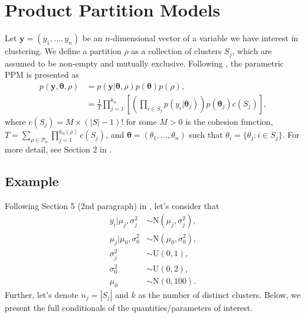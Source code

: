 \documentclass{article}
\begin{document}
\section{Product Partition Models}
Let $\textbf{y} = (y_{1}, ..., y_{n})$ be an $n$-dimensional vector of a variable we have interest in clustering. We define a partition $\rho$ as a collection of clusters $S_{j}$, which are assumed to be non-empty and mutually exclusive. Following \textcite{quintanaetal2018}, the parametric PPM is presented as 
\begin{align}
    p(\textbf{y}, \boldsymbol\theta, \rho) & = p(\textbf{y}| \boldsymbol\theta, \rho) p(\boldsymbol\theta) p(\rho), \nonumber \\
    & = \frac{1}{T} \prod_{j = 1}^{k_{n}} \left[ \left( \prod_{i \in S_{j}} p(y_{i} | \boldsymbol\theta_{j}) \right) p(\boldsymbol\theta_{j}) c(S_{j})\right], \nonumber
\end{align}
where $c(S_{j}) =  M \times (|S| - 1)!$ for some $M > 0$ is the cohesion function, $T = \sum_{\rho \in \mathcal{P}_{n}} \prod_{j=1}^{k_{n}(\rho)} c(S_{j})$, and $\boldsymbol\theta = (\theta_{1}, ..., \theta_{n})$ such that $\theta_{i} = \{\theta_{j}: i \in S_{j} \}$. For more detail, see Section 2 in \textcite{quintanaetal2018}.

\subsection{Example}
Following Section 5 (2nd paragraph) in \textcite{quintanaetal2018}, let's consider that 
\begin{align}
 y_{i}| \mu_{j}, \sigma^{2}_{j} & \sim \mbox{N}(\mu_{j}, \sigma^{2}_{j}), \nonumber \\
\mu_{j}|\mu_{0}, \sigma^{2}_{0} & \sim \mbox{N}(\mu_{0}, \sigma^{2}_{0}), \nonumber\\
\sigma^{2}_{j} & \sim \mbox{U}(0,1), \nonumber \\
\sigma^{2}_{0} & \sim \mbox{U}(0,2), \nonumber\\
\mu_{0} & \sim \mbox{N}(0,100). \nonumber
\end{align}
Further, let's denote $n_{j} = |S_{j}|$ and $k$ as the number of distinct clusters. Below, we present the full conditionals of the quantities/parameters of interest.
\end{document}

